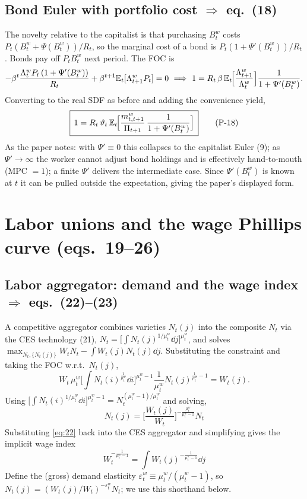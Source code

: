 \subsection{Bond Euler with portfolio cost \texorpdfstring{$\Rightarrow$}{=>} eq.\ (18)}
The novelty relative to the capitalist is that purchasing $B^w_t$ costs
$P_t(B^w_t+\Psi(B^w_t))/R_t$, so the marginal cost of a bond is $P_t(1+\Psi'(B^w_t))/R_t$. Bonds pay
off $P_tB^w_t$ next period. The FOC is
\[
-\beta^t\frac{\Lambda^w_tP_t\,(1+\Psi'(B^w_t))}{R_t}+\beta^{t+1}\mathbb{E}_t[\Lambda^w_{t+1}P_t]=0
\ \Longrightarrow\
1=R_t\,\beta\,\mathbb{E}_t\!\Big[\frac{\Lambda^w_{t+1}}{\Lambda^w_t}\Big]\frac{1}{1+\Psi'(B^w_t)} .
\]
Converting to the real SDF as before and adding the convenience yield,
\begin{equation}\label{eq:18}
\boxed{\,1=R_t\,\vartheta_t\,\mathbb{E}_t\!\Big[\frac{m^w_{t,t+1}}{\Pi_{t+1}}\,\frac{1}{1+\Psi'(B^w_t)}\Big]\,}
\tag{P-18}
\end{equation}
As the paper notes: with $\Psi'\equiv0$ this collapses to the capitalist Euler (9); as
$\Psi'\to\infty$ the worker cannot adjust bond holdings and is effectively hand-to-mouth
(MPC $=1$); a finite $\Psi'$ delivers the intermediate case. Since $\Psi'(B^w_t)$ is known at $t$ it
can be pulled outside the expectation, giving the paper's displayed form.

\section{Labor unions and the wage Phillips curve (eqs.\ 19--26)}\label{sec:unions}

\subsection{Labor aggregator: demand and the wage index \texorpdfstring{$\Rightarrow$}{=>} eqs.\ (22)--(23)}
A competitive aggregator combines varieties $N_t(j)$ into the composite $N_t$ via the CES technology
(21), $N_t=\big[\int N_t(j)^{1/\mu^w_t}\dd j\big]^{\mu^w_t}$, and solves
$\max_{N_t,\{N_t(j)\}}W_tN_t-\int W_t(j)N_t(j)\dd j$. Substituting the constraint and taking the FOC
w.r.t.\ $N_t(j)$,
\[
W_t\,\mu^w_t\Big[\!\int\! N_t(i)^{\frac1{\mu^w_t}}\dd i\Big]^{\mu^w_t-1}\frac{1}{\mu^w_t}N_t(j)^{\frac1{\mu^w_t}-1}=W_t(j).
\]
Using $\big[\int N_t(i)^{1/\mu^w_t}\dd i\big]^{\mu^w_t-1}=N_t^{(\mu^w_t-1)/\mu^w_t}$ and solving,
\begin{equation}\label{eq:22}
\boxed{\,N_t(j)=\Big[\frac{W_t(j)}{W_t}\Big]^{-\frac{\mu^w_t}{\mu^w_t-1}}N_t\,}\tag{P-22}
\end{equation}
Substituting \eqref{eq:22} back into the CES aggregator and simplifying gives the implicit wage index
\begin{equation}\label{eq:23}
\boxed{\,W_t^{-\frac{1}{\mu^w_t-1}}=\int W_t(j)^{-\frac{1}{\mu^w_t-1}}\dd j\,}\tag{P-23}
\end{equation}
Define the (gross) demand elasticity $\varepsilon^w_t\equiv \mu^w_t/(\mu^w_t-1)$, so
$N_t(j)=(W_t(j)/W_t)^{-\varepsilon^w_t}N_t$; we use this shorthand below.

